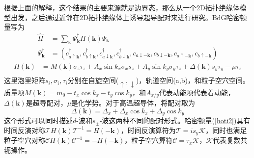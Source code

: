 \qquad 根据上面的解释，这个结果的主要来源就是边界态，那么从一个2D拓扑绝缘体模型出发，之后通过近邻在2D拓扑绝缘体上诱导超导配对来进行研究。BdG哈密顿量写为
\begin{equation}
\begin{aligned}
\hat{H}&=\sum_\mathbf{k}\Psi_\mathbf{k}^\dagger H(\mathbf{k})\Psi_\mathbf{k}\\
\Psi^\dagger_\mathbf{k}&=(c^\dagger_{a\uparrow\mathbf{k}},c^\dagger_{b\uparrow\mathbf{k}},c^\dagger_{a\downarrow\mathbf{k}},c^\dagger_{b\downarrow\mathbf{k}},c_{a\downarrow\mathbf{-k}},c_{b\downarrow\mathbf{-k}},c_{a\uparrow\mathbf{-k}},c_{b\uparrow\mathbf{-k}})
\end{aligned}
\end{equation}
\begin{equation}
\begin{aligned}
H(\mathbf{k})&=M(\mathbf{k})\sigma_z\tau_z+A_x\sin k_x\sigma_xs_z+A_y\sin k_y\sigma_y\tau_z+\Delta(\mathbf{k})s_y\tau_y-\mu\tau_z\\\label{hoti2}
\end{aligned}
\end{equation}
这里泡里矩阵$s_i,\sigma_i,\tau_i$分别在自旋空间($\uparrow,\downarrow$)，轨道空间(a,b)，和粒子空穴空间。质量项$M(\mathbf{k})=m_0-t_x\cos k_x-t_y\cos k_y$，和$A_{x/y}$代表动能项代表着动能，$\Delta(\mathbf{k})$是超导配对，$\mu$是化学势。对于高温超导体，将配对取为
\begin{equation}
\Delta(\mathbf{k})=\Delta_x+\Delta_x\cos k_x+\Delta_y\cos k_y
\end{equation}
这个形式可以同时描述$d$-波和$s_\pm$-波这两种不同的配对形式。哈密顿量(\ref{hoti2})具有时间反演对称$\mathcal{T}H(\mathbf{k})\mathcal{T}^{-1}=H(-\mathbf{k})$，时间反演算符为$\mathcal{T}=is_y\mathcal{K}$，同时也满足粒子空穴对称$\mathcal{C}H(\mathbf{k})\mathcal{C}^{-1}=-H(-\mathbf{k})$，粒子空穴算符$\mathcal{C}=\tau_x\mathcal{K}$，$\mathcal{K}$代表复数共轭操作。

